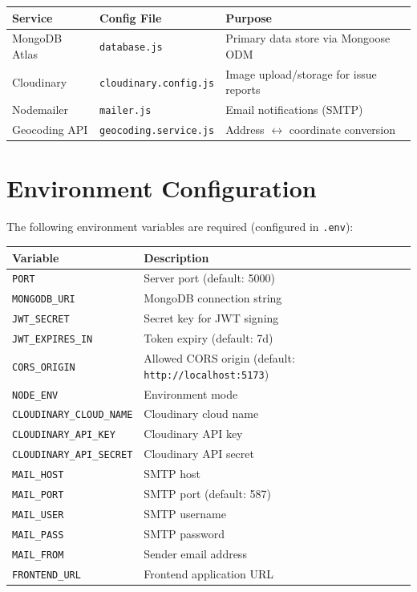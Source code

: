 \documentclass[12pt,a4paper]{article}
\begin{document}
\begin{longtable}{@{}p{3cm}p{3cm}p{6cm}@{}}
\toprule
\textbf{Service} & \textbf{Config File} & \textbf{Purpose} \\
\midrule
\endhead
MongoDB Atlas  & \texttt{database.js}  & Primary data store via Mongoose ODM \\[4pt]
Cloudinary     & \texttt{cloudinary.config.js} & Image upload/storage for issue reports \\[4pt]
Nodemailer     & \texttt{mailer.js}    & Email notifications (SMTP) \\[4pt]
Geocoding API  & \texttt{geocoding.service.js} & Address $\leftrightarrow$ coordinate conversion \\
\bottomrule
\end{longtable}

\section{Environment Configuration}

The following environment variables are required (configured in \texttt{.env}):

\begin{longtable}{@{}p{4.5cm}p{8cm}@{}}
\toprule
\textbf{Variable} & \textbf{Description} \\
\midrule
\endhead
\texttt{PORT}                   & Server port (default: 5000) \\
\texttt{MONGODB\_URI}           & MongoDB connection string \\
\texttt{JWT\_SECRET}            & Secret key for JWT signing \\
\texttt{JWT\_EXPIRES\_IN}       & Token expiry (default: 7d) \\
\texttt{CORS\_ORIGIN}           & Allowed CORS origin (default: \texttt{http://localhost:5173}) \\
\texttt{NODE\_ENV}              & Environment mode \\
\texttt{CLOUDINARY\_CLOUD\_NAME} & Cloudinary cloud name \\
\texttt{CLOUDINARY\_API\_KEY}   & Cloudinary API key \\
\texttt{CLOUDINARY\_API\_SECRET} & Cloudinary API secret \\
\texttt{MAIL\_HOST}             & SMTP host \\
\texttt{MAIL\_PORT}             & SMTP port (default: 587) \\
\texttt{MAIL\_USER}             & SMTP username \\
\texttt{MAIL\_PASS}             & SMTP password \\
\texttt{MAIL\_FROM}             & Sender email address \\
\texttt{FRONTEND\_URL}          & Frontend application URL \\
\bottomrule
\end{longtable}
\end{document}
